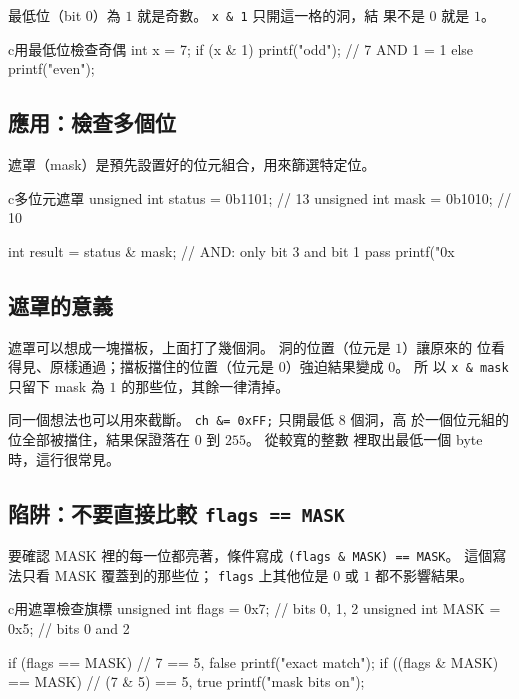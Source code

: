 最低位（bit $0$）為 $1$ 就是奇數。 \texttt{x \& 1} 只開這一格的洞，結
果不是 $0$ 就是 $1$。

\begin{code}{c}{用最低位檢查奇偶}
int x = 7;
if (x & 1) {
    printf("odd\n");   // 7 AND 1 = 1
} else {
    printf("even\n");
}
\end{code}

\subsection{應用：檢查多個位}

遮罩（mask）是預先設置好的位元組合，用來篩選特定位。

\begin{code}{c}{多位元遮罩}
unsigned int status = 0b1101;  // 13
unsigned int mask = 0b1010;    // 10

int result = status & mask;  // AND: only bit 3 and bit 1 pass
printf("0x%
\end{code}

\subsection{遮罩的意義}

遮罩可以想成一塊擋板，上面打了幾個洞。 洞的位置（位元是 $1$）讓原來的
位看得見、原樣通過；擋板擋住的位置（位元是 $0$）強迫結果變成 $0$。 所
以 \texttt{x \& mask} 只留下 mask 為 $1$ 的那些位，其餘一律清掉。

同一個想法也可以用來截斷。 \texttt{ch \&= 0xFF;} 只開最低 8 個洞，高
於一個位元組的位全部被擋住，結果保證落在 $0$ 到 $255$。 從較寬的整數
裡取出最低一個 byte 時，這行很常見。

\subsection[陷阱：flags == MASK 比較法錯了]{陷阱：不要直接比較 \texttt{flags == MASK}}

要確認 MASK 裡的每一位都亮著，條件寫成
\texttt{(flags \& MASK) == MASK}。 這個寫法只看 MASK 覆蓋到的那些位；
\texttt{flags} 上其他位是 $0$ 或 $1$ 都不影響結果。

\begin{code}{c}{用遮罩檢查旗標}
unsigned int flags = 0x7;   // bits 0, 1, 2
unsigned int MASK  = 0x5;   // bits 0 and 2

if (flags == MASK) {              // 7 == 5, false
    printf("exact match\n");
}
if ((flags & MASK) == MASK) {     // (7 & 5) == 5, true
    printf("mask bits on\n");
}
\end{code}

